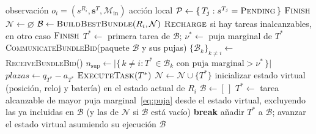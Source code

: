 \begin{algorithm}
\caption{\textsc{CBBA} --- decisión de $R_i$ en un instante de decisión}
\label{alg:cbba}
\begin{algorithmic}[1]
\Require observación $o_i=(s^{R_i},\mathbf{s}^{T},\mathcal{M}_{\mathrm{in}})$
\Ensure acción local
\State $\mathcal{P} \gets \{\,T_j : s^{T_j}=\textsc{Pending}\,\}$
 \Return $\textsc{Finish}$ \EndIf
\State $\mathcal{N} \gets \varnothing$ 
    \State $\mathcal{B} \gets \textsc{BuildBestBundle}(R_i, \mathcal{N})$
        \State \Return $\textsc{Recharge}$ si hay tareas inalcanzables, en otro caso $\textsc{Finish}$
    \EndIf
    \State $T^{*} \gets$ primera tarea de $\mathcal{B}$; \quad $\nu^{*} \gets$ puja marginal de $T^{*}$
    \State \textsc{CommunicateBundleBid}(paquete $\mathcal{B}$ y sus pujas)
    \State $\{\mathcal{B}_k\}_{k\neq i} \gets$ \textsc{ReceiveBundleBid}() 
    \State $n_{\mathrm{sup}} \gets \big|\{\,k\neq i : T^{*}\in\mathcal{B}_k \text{ con puja marginal} > \nu^{*}\,\}\big|$
    \State $\textit{plazas} \gets q_{T^{*}} - a_{T^{*}}$
        \State \Return $\textsc{ExecuteTask}(T^{*})$
    \Else
        \State $\mathcal{N} \gets \mathcal{N}\cup\{T^{*}\}$ 
    \EndIf
\EndWhile
\Statex
{}
    \State inicializar estado virtual (posición, reloj y batería) en el estado actual de $R_i$
    \State $\mathcal{B}\gets[\,]$
        \State $T^{*}\gets$ tarea alcanzable de mayor puja marginal~\eqref{eq:puja} desde el estado virtual,
        \Statex \hspace{2.2em} excluyendo las ya incluidas en $\mathcal{B}$ (y las de $\mathcal{N}$ si $\mathcal{B}$ está vacío)
         \textbf{break} \EndIf
        \State añadir $T^{*}$ a $\mathcal{B}$; avanzar el estado virtual asumiendo su ejecución
    \EndWhile
    \State \Return $\mathcal{B}$
\EndFunction
\end{algorithmic}
\end{algorithm}

